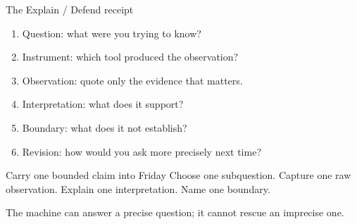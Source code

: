 \documentclass{beamer}
\begin{document}
\begin{frame}{The Explain / Defend receipt}
\begin{enumerate}
  \item Question: what were you trying to know?
  \item Instrument: which tool produced the observation?
  \item Observation: quote only the evidence that matters.
  \item Interpretation: what does it support?
  \item Boundary: what does it not establish?
  \item Revision: how would you ask more precisely next time?
\end{enumerate}
\end{frame}

\begin{frame}{Carry one bounded claim into Friday}
\Large
Choose one subquestion. Capture one raw observation. Explain one interpretation. Name one boundary.

\vspace{1em}
\normalsize
The machine can answer a precise question; it cannot rescue an imprecise one.
\end{frame}
\end{document}
